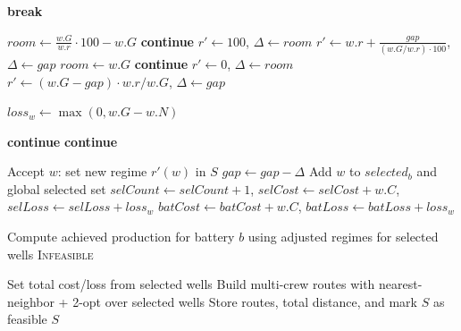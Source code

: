 \documentclass[a4paper,11pt]{article}
\begin{document}
\begin{algorithm}[H]
\begin{algorithmic}[1]
            \State \textbf{break}
        \EndIf

            \State $room \gets \frac{w.G}{w.r} \cdot 100 - w.G$
                \State \textbf{continue}
            \EndIf
                \State $r' \gets 100$, $\Delta \gets room$
            \Else
                \State $r' \gets w.r + \frac{gap}{(w.G/w.r)\cdot 100}$, $\Delta \gets gap$
            \EndIf
        \Else
            \State $room \gets w.G$
                \State \textbf{continue}
            \EndIf
                \State $r' \gets 0$, $\Delta \gets room$
            \Else
                \State $r' \gets (w.G-gap)\cdot w.r / w.G$, $\Delta \gets gap$
            \EndIf
        \EndIf

        \State $loss_w \gets \max(0, w.G-w.N)$

            \State \textbf{continue}
        \EndIf
            \State \textbf{continue}
        \EndIf

        \State Accept $w$: set new regime $r'(w)$ in $S$
        \State $gap \gets gap-\Delta$
        \State Add $w$ to $selected_b$ and global selected set
        \State $selCount \gets selCount+1$, $selCost \gets selCost+w.C$, $selLoss \gets selLoss+loss_w$
        \State $batCost \gets batCost+w.C$, $batLoss \gets batLoss+loss_w$
    \EndFor

    \State Compute achieved production for battery $b$ using adjusted regimes for selected wells
        \State \Return \textsc{Infeasible}
    \EndIf
\EndFor

\State Set total cost/loss from selected wells
\State Build multi-crew routes with nearest-neighbor + 2-opt over selected wells
\State Store routes, total distance, and mark $S$ as feasible
\State \Return $S$

\end{algorithmic}
\end{algorithm}
\end{document}
